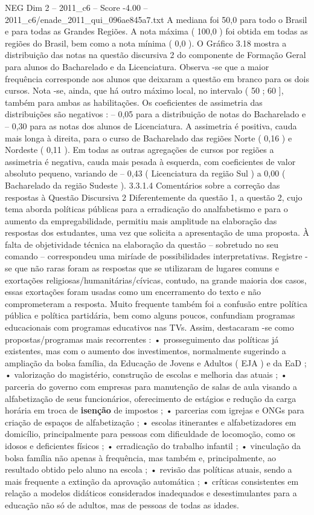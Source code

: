 \begin{textsample}{NEG Dim 2 – 2011\_c6 – Score -4.00 – 2011\_c6/enade\_2011\_qui\_096ae845a7.txt}
A mediana foi 50,0 para todo o Brasil e para todas as Grandes Regiões.
A nota máxima ( 100,0 ) foi obtida em todas as regiões do Brasil, bem como a nota mínima ( 0,0 ).
O Gráfico 3.18 mostra a distribuição das notas na questão discursiva 2 do componente de Formação Geral para alunos do Bacharelado e da Licenciatura.
Observa -se que a maior frequência corresponde aos alunos que deixaram a questão em branco para os dois cursos.
Nota -se, ainda, que há outro máximo local, no intervalo ( 50 ; 60 ], também para ambas as habilitações.
Os coeficientes de assimetria das distribuições são negativos : – 0,05 para a distribuição de notas do Bacharelado e – 0,30 para as notas dos alunos de Licenciatura.
A assimetria é positiva, cauda mais longa à direita, para o curso de Bacharelado das regiões Norte ( 0,16 ) e Nordeste ( 0,11 ).
Em todas as outras agregações de cursos por regiões a assimetria é negativa, cauda mais pesada à esquerda, com coeficientes de valor absoluto pequeno, variando de – 0,43 ( Licenciatura da região Sul ) a 0,00 ( Bacharelado da região Sudeste ). 3.3.1.4 Comentários sobre a correção das respostas à Questão Discursiva 2 Diferentemente da questão 1, a questão 2, cujo tema aborda políticas públicas para a erradicação do analfabetismo e para o aumento da empregabilidade, permitiu mais amplitude na elaboração das respostas dos estudantes, uma vez que solicita a apresentação de uma proposta.
À falta de objetividade técnica na elaboração da questão – sobretudo no seu comando – correspondeu uma miríade de possibilidades interpretativas.
Registre -se que não raras foram as respostas que se utilizaram de lugares comuns e exortações religiosas/humanitárias/cívicas, contudo, na grande maioria dos casos, essas exortações foram usadas como um encerramento do texto e não comprometeram a resposta.
Muito frequente também foi a confusão entre política pública e política partidária, bem como alguns poucos, confundiam programas educacionais com programas educativos nas TVs.
Assim, destacaram -se como propostas/programas mais recorrentes : • prosseguimento das políticas já existentes, mas com o aumento dos investimentos, normalmente sugerindo a ampliação da bolsa família, da Educação de Jovens e Adultos ( EJA ) e da EaD ; • valorização do magistério, construção de escolas e melhoria das atuais ; • parceria do governo com empresas para manutenção de salas de aula visando a alfabetização de seus funcionários, oferecimento de estágios e redução da carga horária em troca de \textbf{isenção} de impostos ; • parcerias com igrejas e ONGs para criação de espaços de alfabetização ; • escolas itinerantes e alfabetizadores em domicílio, principalmente para pessoas com dificuldade de locomoção, como os idosos e deficientes físicos ; • erradicação do trabalho infantil ; • vinculação da bolsa família não apenas à frequência, mas também e, principalmente, ao resultado obtido pelo aluno na escola ; • revisão das políticas atuais, sendo a mais frequente a extinção da aprovação automática ; • críticas consistentes em relação a modelos didáticos considerados inadequados e desestimulantes para a educação não só de adultos, mas de pessoas de todas as idades.

\end{textsample}
